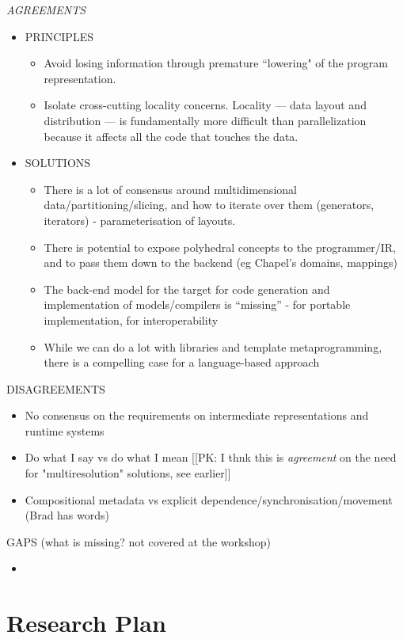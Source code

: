 {\it
AGREEMENTS
\begin{itemize}
\item PRINCIPLES
  \begin{itemize}
  \item Avoid losing information through premature ``lowering" of the program representation.
  \item Isolate cross-cutting locality concerns.  Locality --- data layout and distribution --- is fundamentally more difficult than parallelization because it affects all the code that touches the data.   
  \end{itemize}
\item SOLUTIONS
  \begin{itemize}
  \item There is a lot of consensus around multidimensional data/partitioning/slicing, and how to iterate over them (generators, iterators) - parameterisation of layouts.
  \item There is potential to expose polyhedral concepts to the programmer/IR, and to pass them down to the backend (eg Chapel’s domains, mappings)
  \item The back-end model for the target for code generation and implementation of models/compilers is “missing” - for portable implementation, for interoperability
  \item While we can do a lot with libraries and template metaprogramming, there is a compelling case for a language-based approach
  \end{itemize}
\end{itemize}

DISAGREEMENTS
  \begin{itemize}
   \item No consensus on the requirements on intermediate representations and runtime systems
   \item Do what I say vs do what I mean [[PK: I thnk this is \emph{agreement} on the need for "multiresolution" solutions, see earlier]]
   \item Compositional metadata vs explicit dependence/synchronisation/movement (Brad has words)
  \end{itemize}


  GAPS (what is missing? not covered at the workshop)
  \begin{itemize}
   \item
   \end{itemize}

}
\section{Research Plan}

